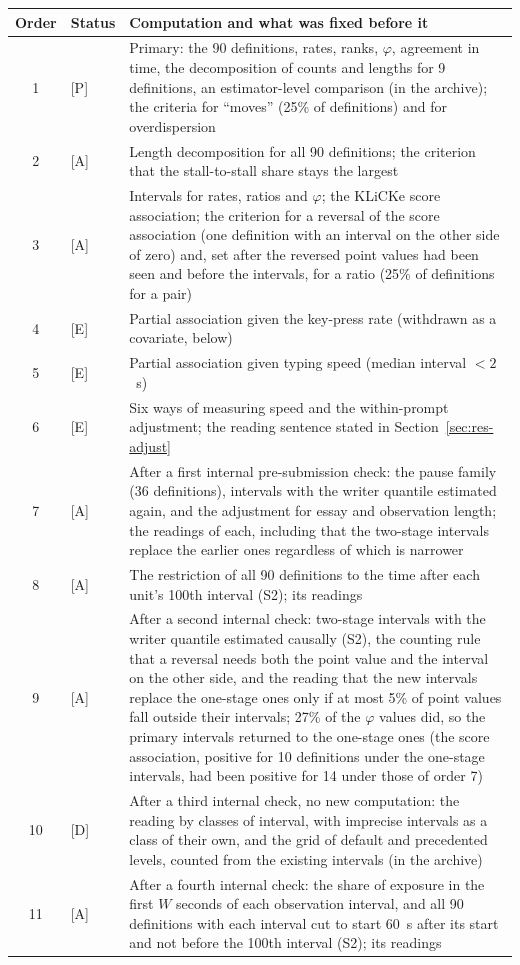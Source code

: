 \begin{center}\footnotesize
\begin{tabularx}{\textwidth}{@{}c l X@{}}
\toprule
Order & Status & Computation and what was fixed before it \\
\midrule
1 & [P] & Primary: the 90 definitions, rates, ranks, $\varphi$, agreement in time, the decomposition of counts and lengths
for 9 definitions, an estimator-level comparison (in the archive); the criteria for ``moves'' (25\% of definitions) and for
overdispersion \\
2 & [A] & Length decomposition for all 90 definitions; the criterion that the stall-to-stall share stays the largest \\
3 & [A] & Intervals for rates, ratios and $\varphi$; the KLiCKe score association; the criterion for a reversal of
the score association (one definition with an interval on the other side of zero) and, set after the reversed point
values had been seen and before the intervals, for a ratio (25\% of definitions for a pair) \\
4 & [E] & Partial association given the key-press rate (withdrawn as a covariate, below) \\
5 & [E] & Partial association given typing speed (median interval $< 2$~s) \\
6 & [E] & Six ways of measuring speed and the within-prompt adjustment; the reading sentence stated in
Section~\ref{sec:res-adjust} \\
7 & [A] & After a first internal pre-submission check: the pause family (36 definitions), intervals with the writer
quantile estimated again, and the adjustment for essay and observation length; the readings of each, including that
the two-stage intervals replace the earlier ones regardless of which is narrower \\
8 & [A] & The restriction of all 90 definitions to the time after each unit's 100th interval (S2); its readings \\
9 & [A] & After a second internal check: two-stage intervals with the writer quantile estimated causally (S2), the
counting rule that a reversal needs both the point value and the interval on the other side, and the reading that the
new intervals replace the one-stage ones only if at most 5\% of point values fall outside their intervals; 27\% of
the $\varphi$ values did, so the primary intervals returned to the one-stage ones (the score association,
positive for 10 definitions under the one-stage intervals, had been positive for 14 under those of order 7) \\
10 & [D] & After a third internal check, no new computation: the reading by classes of interval, with imprecise intervals
as a class of their own, and the grid of default and precedented levels, counted from the existing intervals (in the
archive) \\
11 & [A] & After a fourth internal check: the share of exposure in the first $W$ seconds of each observation interval,
and all 90 definitions with each interval cut to start 60~s after its start and not before the 100th interval (S2);
its readings \\
\bottomrule
\end{tabularx}
\end{center}

